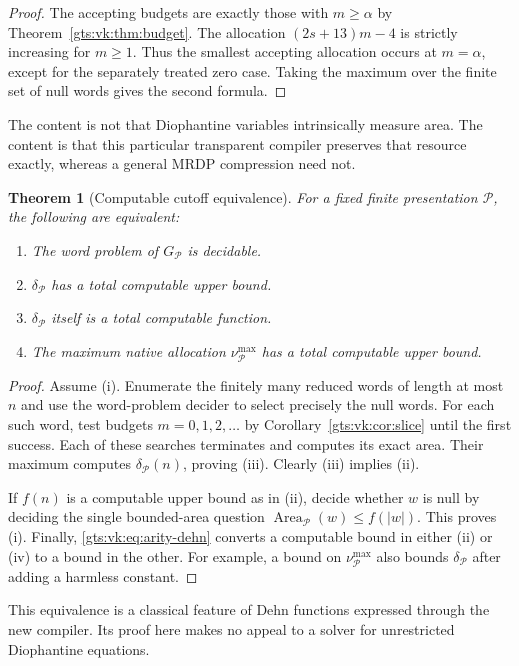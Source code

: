 \documentclass[11pt,letterpaper]{article}
\newtheorem{theorem}{Theorem}[section]
\theoremstyle{definition}
\theoremstyle{remark}
\newcommand{\Pp}{\mathcal P}
\newcommand{\Area}{\operatorname{Area}}
\begin{document}
\begin{proof}
The accepting budgets are exactly those with $m\geq\alpha$ by Theorem~\ref{gts:vk:thm:budget}. The allocation $(2s+13)m-4$ is strictly increasing for $m\geq1$. Thus the smallest accepting allocation occurs at $m=\alpha$, except for the separately treated zero case. Taking the maximum over the finite set of null words gives the second formula.
\end{proof}

The content is not that Diophantine variables intrinsically measure area. The content is that this particular transparent compiler preserves that resource exactly, whereas a general MRDP compression need not.

\begin{theorem}[Computable cutoff equivalence]\label{gts:vk:thm:cutoff}
For a fixed finite presentation $\Pp$, the following are equivalent:
\begin{enumerate}[label=(\roman*)]
\item The word problem of $G_{\Pp}$ is decidable.
\item $\delta_{\Pp}$ has a total computable upper bound.
\item $\delta_{\Pp}$ itself is a total computable function.
\item The maximum native allocation $\nu_{\Pp}^{\max}$ has a total computable upper bound.
\end{enumerate}
\end{theorem}

\begin{proof}
Assume (i). Enumerate the finitely many reduced words of length at most $n$ and use the word-problem decider to select precisely the null words. For each such word, test budgets $m=0,1,2,\ldots$ by Corollary~\ref{gts:vk:cor:slice} until the first success. Each of these searches terminates and computes its exact area. Their maximum computes $\delta_{\Pp}(n)$, proving (iii). Clearly (iii) implies (ii).

If $f(n)$ is a computable upper bound as in (ii), decide whether $w$ is null by deciding the single bounded-area question $\Area_{\Pp}(w)\leq f(|w|)$. This proves (i). Finally, \eqref{gts:vk:eq:arity-dehn} converts a computable bound in either (ii) or (iv) to a bound in the other. For example, a bound on $\nu_{\Pp}^{\max}$ also bounds $\delta_{\Pp}$ after adding a harmless constant.
\end{proof}

This equivalence is a classical feature of Dehn functions expressed through the new compiler. Its proof here makes no appeal to a solver for unrestricted Diophantine equations.
\end{document}
